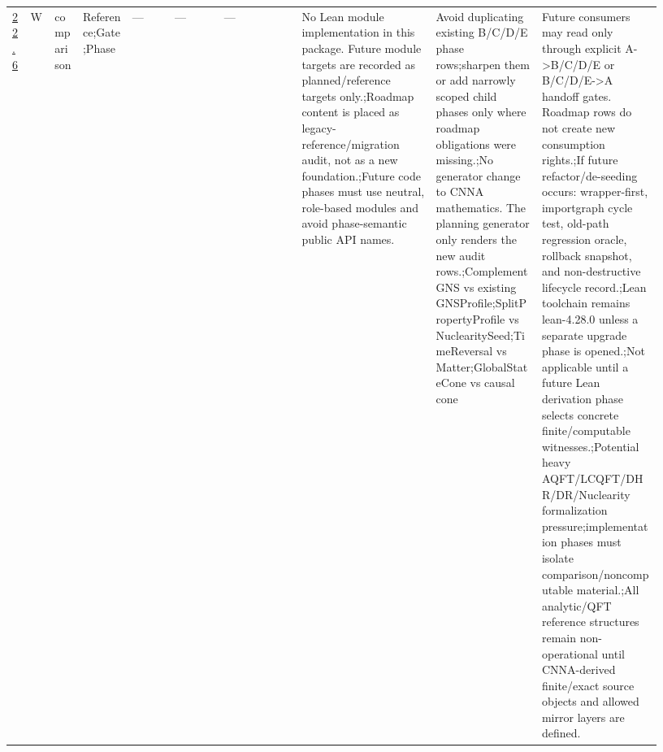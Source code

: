 \begin{longtable}{L{0.026\linewidth} L{0.024\linewidth} L{0.045\linewidth} L{0.07\linewidth} L{0.065\linewidth} L{0.075\linewidth} L{0.11\linewidth} L{0.19\linewidth} L{0.155\linewidth} L{0.17\linewidth}}
\hline
\addlinespace[0.24em]
\hyperlink{phase-row-22-6}{22.6} & W & comparison & Reference;\newline Gate;\newline Phase & --- & --- & --- & No Lean module implementation in this package. Future module targets are recorded as planned/\allowbreak{}reference targets only.;\newline Roadmap content is placed as legacy-reference/\allowbreak{}migration audit, not as a new foundation.;\newline Future code phases must use neutral, role-based modules and avoid phase-semantic public API names. & Avoid duplicating existing B/\allowbreak{}C/\allowbreak{}D/\allowbreak{}E phase rows;\newline sharpen them or add narrowly scoped child phases only where roadmap obligations were missing.;\newline No generator change to CNNA mathematics. The planning generator only renders the new audit rows.;\newline ComplementGNS vs existing GNSProfile;\newline SplitPropertyProfile vs NuclearitySeed;\newline TimeReversal vs Matter;\newline GlobalStateCone vs causal cone & Future consumers may read only through explicit A->B/\allowbreak{}C/\allowbreak{}D/\allowbreak{}E or B/\allowbreak{}C/\allowbreak{}D/\allowbreak{}E->A handoff gates. Roadmap rows do not create new consumption rights.;\newline If future refactor/\allowbreak{}de-seeding occurs: wrapper-first, importgraph cycle test, old-path regression oracle, rollback snapshot, and non-destructive lifecycle record.;\newline Lean toolchain remains lean-4.28.0 unless a separate upgrade phase is opened.;\newline Not applicable until a future Lean derivation phase selects concrete finite/\allowbreak{}computable witnesses.;\newline Potential heavy AQFT/\allowbreak{}LCQFT/\allowbreak{}DHR/\allowbreak{}DR/\allowbreak{}Nuclearity formalization pressure;\newline implementation phases must isolate comparison/\allowbreak{}noncomputable material.;\newline All analytic/\allowbreak{}QFT reference structures remain non-operational until CNNA-derived finite/\allowbreak{}exact source objects and allowed mirror layers are defined.\\

\end{longtable}
